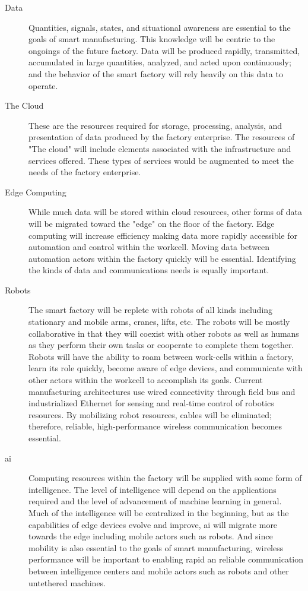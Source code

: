\begin{description}
	
	\item[Data] Quantities, signals, states, and situational awareness are essential to the goals of smart manufacturing. This knowledge will be centric to the ongoings of the future factory.  Data will be produced rapidly, transmitted, accumulated in large quantities, analyzed, and acted upon continuously; and the behavior of the smart factory will rely heavily on this data to operate. 
	 
	\item[The Cloud] These are the resources required for storage, processing, analysis, and presentation of data produced by the factory enterprise.  The resources of "The cloud" will include elements associated with the infrastructure and services offered.  These types of services would be augmented to meet the needs of the factory enterprise.
	
	\item[Edge Computing]  While much data will be stored within cloud resources, other forms of data will be migrated toward the "edge" on the floor of the factory.  Edge computing will increase efficiency making data more rapidly accessible for automation and control within the workcell.  Moving data between automation actors within the factory quickly will be essential.  Identifying the kinds of data and communications needs is equally important.
	
	\item[Robots] The smart factory will be replete with robots of all kinds including stationary and mobile arms, cranes, lifts, etc.  The robots will be mostly collaborative in that they will coexist with other robots as well as humans as they perform their own tasks or cooperate to complete them together.  Robots will have the ability to roam between work-cells within a factory, learn its role quickly, become aware of edge devices, and communicate with other actors within the workcell to accomplish its goals.  Current manufacturing architectures use wired connectivity through field bus and industrialized Ethernet for sensing and real-time control of robotics resources. By mobilizing robot resources, cables will be eliminated; therefore, reliable, high-performance wireless communication becomes essential.
	
	\item[\Gls{ai}] Computing resources within the factory will be supplied with some form of intelligence.  The level of intelligence will depend on the applications required and the level of advancement of machine learning in general.  Much of the intelligence will be centralized in the beginning, but as the capabilities of edge devices evolve and improve, \gls{ai} will migrate more towards the edge including mobile actors such as robots.   And since mobility is also essential to the goals of smart manufacturing, wireless performance will be important to enabling rapid an reliable communication between intelligence centers and mobile actors such as robots and other untethered machines.
	

\end{description}

